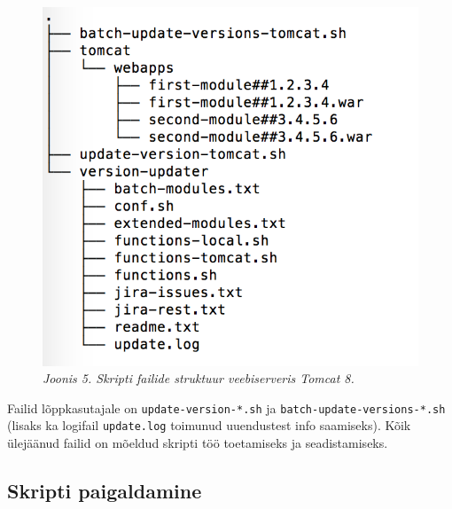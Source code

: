 \documentclass[12pt]{article}
\newcommand{\code}[1]{\texttt{#1}}
\begin{document}
  \begin{figure}[H] 
    \begin{center}
      \includegraphics{screenshots/file-structure-on-tomcat.png}
      \caption*{\textit{Joonis 5. Skripti failide struktuur veebiserveris Tomcat 8.}}
      \end{center}
   \end{figure}
   
   Failid lõppkasutajale on \code{update-version-*.sh} ja \code{batch-update-versions-*.sh} (lisaks ka logifail \code{update.log} toimunud uuendustest info saamiseks). Kõik ülejäänud failid on mõeldud skripti töö toetamiseks ja seadistamiseks.
   
   \newpage
      
 \subsection{Skripti paigaldamine}
  
\end{document}
